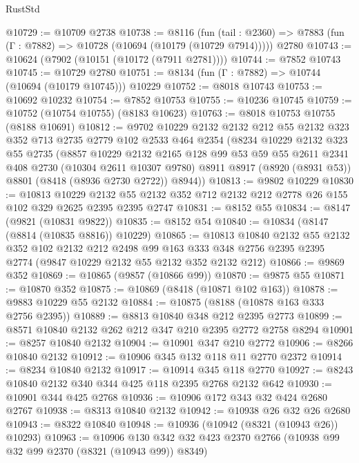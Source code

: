 \begin{lexlean}{RustStd}
\begin{coremodule}
@10729 := @10709 @2738
@10738 := @8116
    (fun (tail : @2360) => @7883 (fun (Γ : @7882) => @10728 (@10694 (@10179 (@10729 @7914)))))
    @2780
@10743 := @10624 (@7902 (@10151 (@10172 (@7911 @2781))))
@10744 := @7852 @10743
@10745 := @10729 @2780
@10751 := @8134 (fun (Γ : @7882) => @10744 (@10694 (@10179 @10745))) @10229
@10752 := @8018 @10743
@10753 := @10692 @10232
@10754 := @7852 @10753
@10755 := @10236 @10745
@10759 := @10752 (@10754 @10755) (@8183 @10623)
@10763 := @8018 @10753 @10755 (@8188 @10691)
@10812 := @9702
    @10229
    @2132
    @2132
    @212
    @55
    @2132
    @323
    @352
    @713
    @2735
    @2779
    @102
    @2533
    @464
    @2354
    (@8234
      @10229
      @2132
      @323
      @55
      @2735
      (@8857
        @10229
        @2132
        @2165
        @128
        @99
        @53
        @59
        @55
        @2611
        @2341
        @408
        @2730
        (@10304 @2611 @10307 @9780)
        @8911
        @8917
        (@8920 (@8931 @53))
        @8801
        (@8418 (@8936 @2730 @2722))
        @8944))
@10813 := @9802 @10229
@10830 := @10813
    @10229
    @2132
    @55
    @2132
    @352
    @712
    @2132
    @212
    @2778
    @26
    @155
    @102
    @329
    @2625
    @2395
    @2395
    @2747
@10831 := @8152 @55
@10834 := @8147 (@9821 (@10831 @9822))
@10835 := @8152 @54
@10840 := @10834 (@8147 (@8814 (@10835 @8816)) @10229)
@10865 := @10813
    @10840
    @2132
    @55
    @2132
    @352
    @102
    @2132
    @212
    @2498
    @99
    @163
    @333
    @348
    @2756
    @2395
    @2395
    @2774
    (@9847 @10229 @2132 @55 @2132 @352 @2132 @212)
@10866 := @9869 @352
@10869 := @10865 (@9857 (@10866 @99))
@10870 := @9875 @55
@10871 := @10870 @352
@10875 := @10869 (@8418 (@10871 @102 @163))
@10878 := @9883 @10229 @55 @2132
@10884 := @10875 (@8188 (@10878 @163 @333 @2756 @2395))
@10889 := @8813 @10840 @348 @212 @2395 @2773
@10899 := @8571 @10840 @2132 @262 @212 @347 @210 @2395 @2772 @2758 @8294
@10901 := @8257 @10840 @2132
@10904 := @10901 @347 @210 @2772
@10906 := @8266 @10840 @2132
@10912 := @10906 @345 @132 @118 @11 @2770 @2372
@10914 := @8234 @10840 @2132
@10917 := @10914 @345 @118 @2770
@10927 := @8243 @10840 @2132 @340 @344 @425 @118 @2395 @2768 @2132 @642
@10930 := @10901 @344 @425 @2768
@10936 := @10906 @172 @343 @32 @424 @2680 @2767
@10938 := @8313 @10840 @2132
@10942 := @10938 @26 @32 @26 @2680
@10943 := @8322 @10840
@10948 := @10936 (@10942 (@8321 (@10943 @26)) @10293)
@10963 := @10906
    @130
    @342
    @32
    @423
    @2370
    @2766
    (@10938 @99 @32 @99 @2370 (@8321 (@10943 @99)) @8349)

\end{coremodule}
\end{lexlean}

